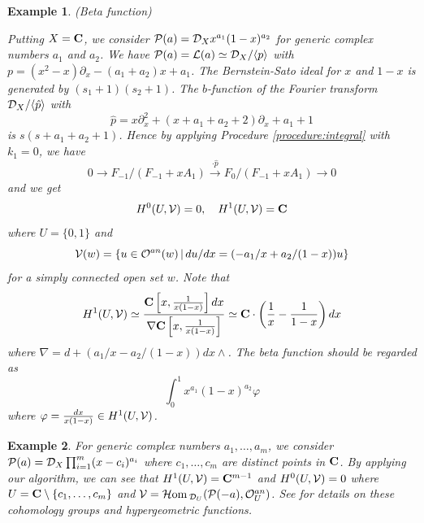 \documentclass[12pt]{article}
\def\pd#1{ \partial_{#1} }
\def\C{{\bf C}}
\def\hol{ {\cal O} }
\def\Hom{ {\cal H}{\rm om}\, }
\def\Dsc{ {\cal D} }
\def\Lsc{ {\cal L} }
\def\Psc{ {\cal P} }
\def\Vsc{ {\cal V} }
\newtheorem{example}{Example}[section]
\begin{document}
\begin{example} \rm (Beta function) 

Putting $X = \C$, we consider
$ \Psc(a) = \Dsc_X x^{a_1} (1-x)^{a_2} $
for generic complex numbers $a_1$ and $a_2$.
We have
$\Psc(a) = \Lsc(a) \simeq \Dsc_X/\langle p \rangle$
with $p = (x^2-x)\pd{x} - (a_1+a_2) x + a_1$.
The Bernstein-Sato ideal for $x$ and $1-x$ is generated by $(s_1+1)(s_2+1)$.  
The $b$-function of the Fourier transform $\Dsc_X/\langle \hat p \rangle$
with 
$$
 \hat p = x\pd{x}^2 + (x+a_1+a_2+2)\pd{x} + a_1 + 1
$$
is $s(s+a_1+a_2+1)$.  
Hence by applying Procedure \ref{procedure:integral} with $k_1 = 0$, 
we have
$$  0 \longrightarrow F_{-1}/( F_{-1} + x A_1 )
    \stackrel{\cdot {\hat p}}{\longrightarrow}
      F_0/( F_{-1} + x A_1 )
    \longrightarrow 0
$$ and
we get
$$ H^0(U,\Vsc) = 0, \quad H^1(U,\Vsc) = \C $$
where  $U = \{ 0, 1 \}$
and
$$\Vsc(w) =  \{ u \in \hol^{an}(w) \,|\, 
               du/dx = (-a_1/x+a_2/(1-x)) u \}$$
for a simply connected open set $w$.
Note that
$$ H^{1}(U,\Vsc) \simeq{{\C\left[x,{1 \over {x(1-x)}}\right]dx} \over
                        {\nabla \C\left[x,{1 \over {x(1-x)}}\right]}}
                 \simeq \C \cdot \left({1 \over x}-{1 \over {1-x}} \right) dx
$$
where $\nabla = d + (a_1/x - a_2/(1-x))dx \wedge$.
The beta function should be regarded as
$$ \int_{0}^1 x^{a_1}(1-x)^{a_2} \varphi $$
where
$\varphi={{dx} \over {x(1-x)}} \in H^{1}(U,\Vsc)$.
\end{example}

\begin{example} \rm
For generic complex numbers $a_1, \ldots, a_m$, 
we consider
$\Psc(a) = \Dsc_X \prod_{i=1}^m (x-c_i)^{a_i}$
where
$ c_1, \ldots, c_m$ are distinct points in $\C$.
By applying our algorithm, we can see that
$ H^1(U,\Vsc) = \C^{m-1}$ and
$H^0(U,\Vsc) = 0$
where $U = \C \setminus \{ c_1, \ldots, c_m \}$
and
$ \Vsc = \Hom_{\Dsc_U}(\Psc(-a),\hol^{an}_U)$.
See \cite{Aomoto-Kita} for details on these cohomology groups 
and hypergeometric functions.
\end{example}
\end{document}
